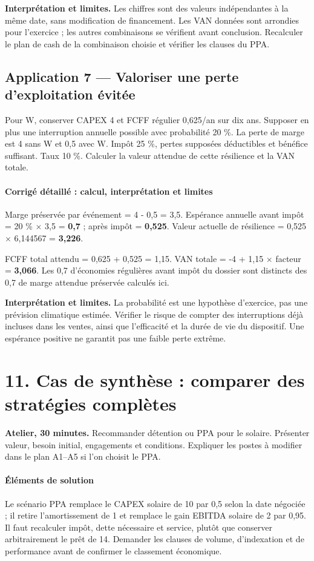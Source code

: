 \documentclass[12pt,a4paper]{article}
\begin{document}
\textbf{Interprétation et limites.} Les chiffres sont des valeurs indépendantes à la même date, sans modification de financement. Les VAN données sont arrondies pour l’exercice ; les autres combinaisons se vérifient avant conclusion. Recalculer le plan de cash de la combinaison choisie et vérifier les clauses du PPA.


\subsection*{Application 7 --- Valoriser une perte d’exploitation évitée}
Pour W, conserver CAPEX 4 et FCFF régulier 0,625/an sur dix ans. Supposer en plus une interruption annuelle possible avec probabilité 20 \%. La perte de marge est 4 sans W et 0,5 avec W. Impôt 25 \%, pertes supposées déductibles et bénéfice suffisant. Taux 10 \%. Calculer la valeur attendue de cette résilience et la VAN totale.


\paragraph{Corrigé détaillé : calcul, interprétation et limites}
Marge préservée par événement = 4 - 0,5 = 3,5. Espérance annuelle avant impôt = 20 \% $\times$ 3,5 = \textbf{0,7} ; après impôt = \textbf{0,525}. Valeur actuelle de résilience = 0,525 $\times$ 6,144567 = \textbf{3,226}.

FCFF total attendu = 0,625 + 0,525 = 1,15. VAN totale = -4 + 1,15 $\times$ facteur = \textbf{3,066}. Les 0,7 d’économies régulières avant impôt du dossier sont distincts des 0,7 de marge attendue préservée calculés ici.

\textbf{Interprétation et limites.} La probabilité est une hypothèse d’exercice, pas une prévision climatique estimée. Vérifier le risque de compter des interruptions déjà incluses dans les ventes, ainsi que l’efficacité et la durée de vie du dispositif. Une espérance positive ne garantit pas une faible perte extrême.

\section*{11. Cas de synthèse : comparer des stratégies complètes}
\textbf{Atelier, 30 minutes.} Recommander détention ou PPA pour le solaire. Présenter valeur, besoin initial, engagements et conditions. Expliquer les postes à modifier dans le plan A1--A5 si l’on choisit le PPA.



\paragraph{Éléments de solution}
Le scénario PPA remplace le CAPEX solaire de 10 par 0,5 selon la date négociée ; il retire l’amortissement de 1 et remplace le gain EBITDA solaire de 2 par 0,95. Il faut recalculer impôt, dette nécessaire et service, plutôt que conserver arbitrairement le prêt de 14. Demander les clauses de volume, d’indexation et de performance avant de confirmer le classement économique.
\end{document}
